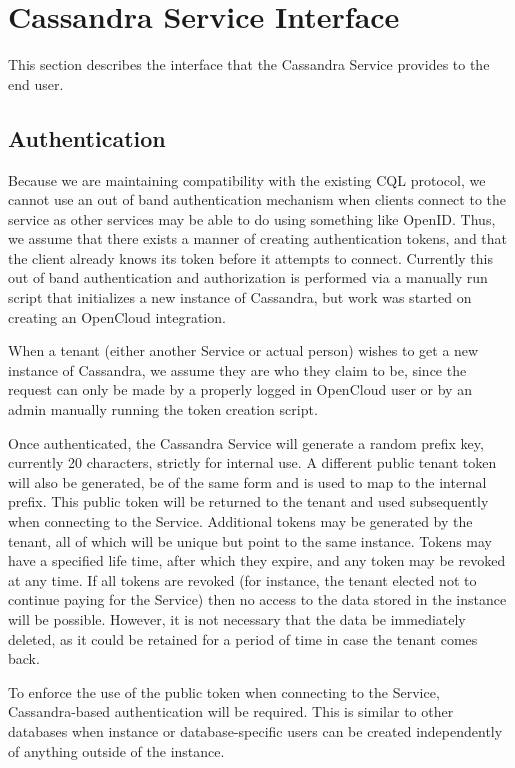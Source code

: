 \documentclass[11pt,notitlepage]{report}
\begin{document}
\chapter*{Cassandra Service Interface}
This section describes the interface that the Cassandra Service provides to the end user.

\section*{Authentication}

Because we are maintaining compatibility with the existing CQL protocol, we cannot use an out of band authentication mechanism when clients connect to the service as other services may be able to do using something like OpenID. Thus, we assume that there exists a manner of creating authentication tokens, and that the client already knows its token before it attempts to connect. Currently this out of band authentication and authorization is performed via a manually run script that initializes a new instance of Cassandra, but work was started on creating an OpenCloud integration.

When a tenant (either another Service or actual person) wishes to get a new instance of Cassandra, we assume they are who they claim to be, since the request can only be made by a properly logged in OpenCloud user or by an admin manually running the token creation script.

Once authenticated, the Cassandra Service will generate a random prefix key, currently 20 characters, strictly for internal use. A different public tenant token will also be generated, be of the same form and is used to map to the internal prefix. This public token will be returned to the tenant and used subsequently when connecting to the Service. Additional tokens may be generated by the tenant, all of which will be unique but point to the same instance. Tokens may have a specified life time, after which they expire, and any token may be revoked at any time. If all tokens are revoked (for instance, the tenant elected not to continue paying for the Service) then no access to the data stored in the instance will be possible. However, it is not necessary that the data be immediately deleted, as it could be retained for a period of time in case the tenant comes back.

To enforce the use of the public token when connecting to the Service, Cassandra-based authentication will be required. This is similar to other databases when instance or database-specific users can be created independently of anything outside of the instance.
\end{document}
